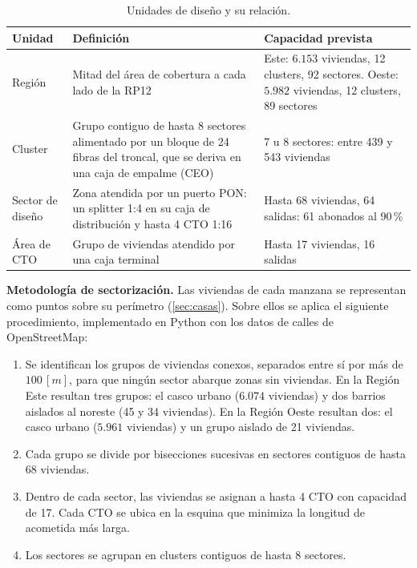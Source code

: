 \begin{table}[H]
    \centering
    \footnotesize
    \caption{Unidades de diseño y su relación.}
    \label{tab:unidades}
    \begin{tabular}{|l|p{6.4cm}|p{5.0cm}|}
        \hline
        \textbf{Unidad} & \textbf{Definición} & \textbf{Capacidad prevista} \\
        \hline
        Región & Mitad del área de cobertura a cada lado de la RP12 & Este: $6.153$ viviendas, 12 clusters, 92 sectores. Oeste: $5.982$ viviendas, 12 clusters, 89 sectores \\
        \hline
        Cluster & Grupo contiguo de hasta 8 sectores alimentado por un bloque de 24 fibras del troncal, que se deriva en una caja de empalme (CEO) & 7 u 8 sectores: entre 439 y 543 viviendas \\
        \hline
        Sector de diseño & Zona atendida por un puerto PON: un splitter 1:4 en su caja de distribución y hasta 4 CTO 1:16 & Hasta 68 viviendas, 64 salidas: 61 abonados al 90\,\% \\
        \hline
        Área de CTO & Grupo de viviendas atendido por una caja terminal & Hasta 17 viviendas, 16 salidas \\
        \hline
    \end{tabular}
\end{table}

\textbf{Metodología de sectorización.} Las viviendas de cada manzana se representan como puntos sobre su perímetro (\autoref{sec:casas}). Sobre ellos se aplica el siguiente procedimiento, implementado en Python con los datos de calles de OpenStreetMap:
\begin{enumerate}
    \item Se identifican los grupos de viviendas conexos, separados entre sí por más de $100 \, [m]$, para que ningún sector abarque zonas sin viviendas. En la Región Este resultan tres grupos: el casco urbano ($6.074$ viviendas) y dos barrios aislados al noreste (45 y 34 viviendas). En la Región Oeste resultan dos: el casco urbano ($5.961$ viviendas) y un grupo aislado de 21 viviendas.
    \item Cada grupo se divide por bisecciones sucesivas en sectores contiguos de hasta 68 viviendas.
    \item Dentro de cada sector, las viviendas se asignan a hasta 4 CTO con capacidad de 17. Cada CTO se ubica en la esquina que minimiza la longitud de acometida más larga.
    \item Los sectores se agrupan en clusters contiguos de hasta 8 sectores.
\end{enumerate}

